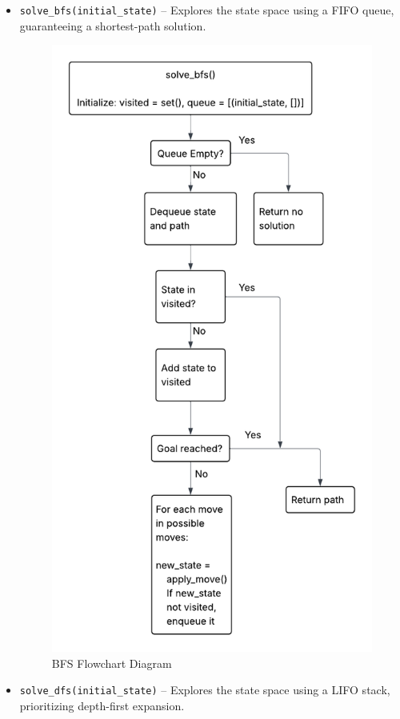 \documentclass[journal]{./IEEE/IEEEtran}
\begin{document}
\begin{itemize}
  \item \texttt{solve\_bfs(initial\_state)} – Explores the state space using a FIFO queue, guaranteeing a shortest-path solution.

  \begin{figure}[H]
    \centering
    \includegraphics[width=0.6\linewidth]{pictures-Clarence/bfs flowchart.png}
    \caption{BFS Flowchart Diagram}
    \label{fig:bfs_flowchart}
\end{figure}

  \item \texttt{solve\_dfs(initial\_state)} – Explores the state space using a LIFO stack, prioritizing depth-first expansion.
  

\end{itemize}
\end{document}
